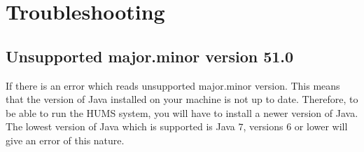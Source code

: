 \documentclass[10pt,a4paper]{article}
\begin{document}
\section{Troubleshooting}

\subsection{Unsupported major.minor version 51.0}

If there is an error which reads unsupported major.minor version. This means that the version of Java installed on your machine is not up to date. Therefore, to be able to run the HUMS system, you will have to install a newer version of Java. The lowest version of Java which is supported is Java $7$, versions $6$ or lower will give an error of this nature.
\end{document}
